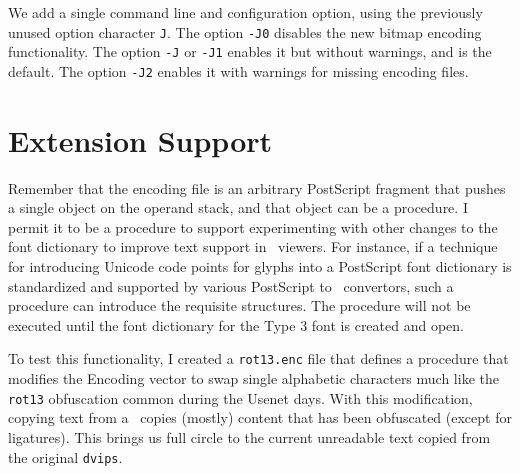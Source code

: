 \documentclass{ltugboat}
\def\PDF{\acro{PDF}}
\def\dvips{\texttt{dvips}}
\begin{document}
We add a single command line and configuration option, using the
previously unused option character \texttt{J}.  The option
\texttt{-J0} disables the new bitmap encoding functionality.
The option \texttt{-J} or \texttt{-J1} enables it but without
warnings, and is the default.  The option \texttt{-J2} enables
it with warnings for missing encoding files.

\section{Extension Support}

Remember that the encoding file is an arbitrary PostScript fragment
that pushes a single object on the operand stack, and that object
can be a procedure.  I permit it to be a procedure to support
experimenting with other changes to the font dictionary to improve
text support in \PDF\ viewers.  For instance, if a technique for
introducing Unicode code points for glyphs into a PostScript font
dictionary is standardized and supported by various PostScript
to \PDF\ convertors, such a procedure can introduce the requisite
structures.  The procedure will not be executed until the
font dictionary for the Type 3 font is created and open.

To test this functionality, I created a \texttt{rot13.enc} file
that defines a procedure that modifies the Encoding vector to swap
single alphabetic characters much like the \texttt{rot13} obfuscation
common during the Usenet days.  With this modification, copying
text from a \PDF\ copies (mostly) content that has been obfuscated
(except for ligatures).  This brings us full circle to the
current unreadable text copied from the original \dvips.

\SetBibJustification{\raggedright}



\makesignature
\end{document}
